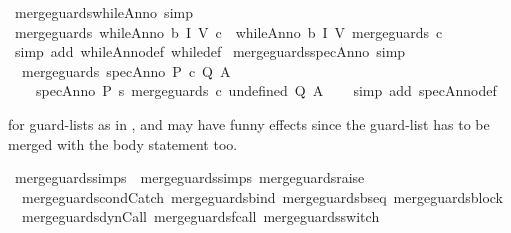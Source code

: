 \begin{isabellebody}
\endisatagproof
{\isafoldproof}%
%
\isadelimproof
\isanewline
%
\endisadelimproof
\isanewline
{}\isamarkupfalse%
\ merge{\isacharunderscore}guards{\isacharunderscore}whileAnno\ {\isacharbrackleft}simp{\isacharbrackright}{\isacharcolon}\isanewline
\ {\isachardoublequoteopen}merge{\isacharunderscore}guards\ {\isacharparenleft}whileAnno\ b\ I\ V\ c{\isacharparenright}\ {\isacharequal}\ whileAnno\ b\ I\ V\ {\isacharparenleft}merge{\isacharunderscore}guards\ c{\isacharparenright}{\isachardoublequoteclose}\isanewline
%
\isadelimproof
\ \ %
\endisadelimproof
%
\isatagproof
{}\isamarkupfalse%
\ {\isacharparenleft}simp\ add{\isacharcolon}\ whileAnno{\isacharunderscore}def\ while{\isacharunderscore}def{\isacharparenright}%
\endisatagproof
{\isafoldproof}%
%
\isadelimproof
\isanewline
%
\endisadelimproof
\isanewline
{}\isamarkupfalse%
\ merge{\isacharunderscore}guards{\isacharunderscore}specAnno\ {\isacharbrackleft}simp{\isacharbrackright}{\isacharcolon}\isanewline
\ \ {\isachardoublequoteopen}merge{\isacharunderscore}guards\ {\isacharparenleft}specAnno\ P\ c\ Q\ A{\isacharparenright}\ {\isacharequal}\ \isanewline
\ \ \ \ specAnno\ P\ {\isacharparenleft}{\isasymlambda}s{\isachardot}\ merge{\isacharunderscore}guards\ {\isacharparenleft}c\ undefined{\isacharparenright}{\isacharparenright}\ Q\ A{\isachardoublequoteclose}\isanewline
%
\isadelimproof
\ \ %
\endisadelimproof
%
\isatagproof
{}\isamarkupfalse%
\ {\isacharparenleft}simp\ add{\isacharcolon}\ specAnno{\isacharunderscore}def{\isacharparenright}%
\endisatagproof
{\isafoldproof}%
%
\isadelimproof
%
\endisadelimproof
%
\begin{isamarkuptext}%
 for guard-lists as in , 
 and  may have funny effects since the guard-list has to
 be merged with the body statement too.%
\end{isamarkuptext}\isamarkuptrue%
\isamarkupfalse%
\ merge{\isacharunderscore}guards{\isacharunderscore}simps\ {\isacharequal}\ merge{\isacharunderscore}guards{\isachardot}simps\ merge{\isacharunderscore}guards{\isacharunderscore}raise\ \isanewline
\ \ merge{\isacharunderscore}guards{\isacharunderscore}condCatch\ merge{\isacharunderscore}guards{\isacharunderscore}bind\ merge{\isacharunderscore}guards{\isacharunderscore}bseq\ merge{\isacharunderscore}guards{\isacharunderscore}block\isanewline
\ \ merge{\isacharunderscore}guards{\isacharunderscore}dynCall\ merge{\isacharunderscore}guards{\isacharunderscore}fcall\ merge{\isacharunderscore}guards{\isacharunderscore}switch\ \isanewline

\end{isabellebody}
